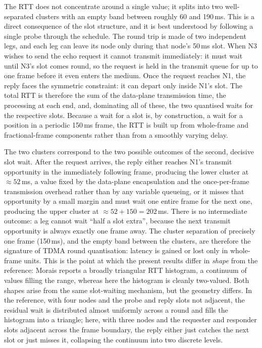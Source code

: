 The RTT does not concentrate around a single value; it splits into two
well-separated clusters with an empty band between roughly 60 and 190\,ms.
This is a direct consequence of the slot structure, and it is best understood
by following a single probe through the schedule. The round trip is made of
two independent legs, and each leg can leave its node only during that node's
50\,ms slot. When N3 wishes to send the echo request it cannot transmit
immediately: it must wait until N3's slot comes round, so the request is held
in the transmit queue for up to one frame before it even enters the medium.
Once the request reaches N1, the reply faces the symmetric constraint: it
can depart only inside N1's slot. The total RTT is therefore the sum of the
data-plane transmission time, the processing at each end, and, dominating all
of these, the two quantised waits for the respective slots. Because a wait for
a slot is, by construction, a wait for a position in a periodic 150\,ms frame,
the RTT is built up from whole-frame and fractional-frame components rather
than from a smoothly varying delay.

The two clusters correspond to the two possible outcomes of the second, decisive
slot wait. After the request arrives, the reply either reaches N1's transmit
opportunity in the immediately following frame, producing the lower cluster
at $\approx 52$\,ms, a value fixed by the data-plane encapsulation and the
once-per-frame transmission overhead rather than by any variable queueing,
or it misses that opportunity by a small margin and must wait one entire frame
for the next one, producing the upper cluster at $\approx 52 + 150 = 202$\,ms.
There is no intermediate outcome: a leg cannot wait ``half a slot extra'',
because the next transmit opportunity is always exactly one frame away. The
cluster separation of precisely one frame (150\,ms), and the empty band between
the clusters, are therefore the signature of TDMA round quantisation: latency
is gained or lost only in whole-frame units. This is the point at which the
present results differ in \emph{shape} from the reference: Morais reports a
broadly triangular RTT histogram, a continuum of values filling the range,
whereas here the histogram is cleanly two-valued. Both shapes arise from the
same slot-waiting mechanism, but the geometry differs. In the reference, with
four nodes and the probe and reply slots not adjacent, the residual wait is
distributed almost uniformly across a round and fills the histogram into a
triangle; here, with three nodes and the requester and responder slots adjacent
across the frame boundary, the reply either just catches the next slot or just
misses it, collapsing the continuum into two discrete levels.

